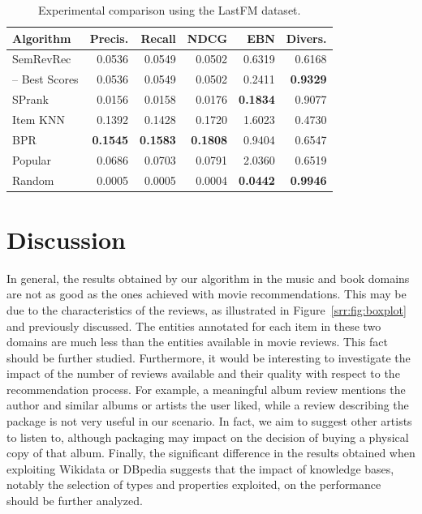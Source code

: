 \begin{table}
\centering
\begin{tabular}{@{}lrrrrr@{}}
\toprule
Algorithm & Precis. & Recall & NDCG   & EBN    & Divers. \\ \midrule
SemRevRec & 0.0536  & 0.0549 & 0.0502 & 0.6319 & 0.6168 \\
-- Best Scores & 0.0536  & 0.0549 & 0.0502 & 0.2411 & \textbf{0.9329} \\ \midrule
SPrank    & 0.0156  & 0.0158 & 0.0176 & \textbf{0.1834} & 0.9077 \\
Item KNN  & 0.1392  & 0.1428 & 0.1720 & 1.6023 & 0.4730 \\
BPR       & \textbf{0.1545}  & \textbf{0.1583} & \textbf{0.1808} & 0.9404 & 0.6547 \\
Popular   & 0.0686  & 0.0703 & 0.0791 & 2.0360 & 0.6519 \\
Random    & 0.0005  & 0.0005 & 0.0004 & \textbf{0.0442} & \textbf{0.9946} \\ \bottomrule
\end{tabular}
\caption[Comparison using the LastFM dataset]{Experimental comparison using the LastFM dataset.}
\label{srr:tab:ex2-fm}
\end{table}

\section{Discussion}
\label{srr:sec:discussion}

In general, the results obtained by our algorithm in the music and book domains are not as good as the ones achieved with movie recommendations. This may be due to the characteristics of the reviews, as illustrated in Figure~\ref{srr:fig:boxplot} and previously discussed. The entities annotated for each item in these two domains are much less than the entities available in movie reviews. This fact should be further studied. Furthermore, it would be interesting to investigate the impact of the number of reviews available and their quality with respect to the recommendation process. For example, a meaningful album review mentions the author and similar albums or artists the user liked, while a review describing the package is not very useful in our scenario. In fact, we aim to suggest other artists to listen to, although packaging may impact on the decision of buying a physical copy of that album. Finally, the significant difference in the results obtained when exploiting Wikidata or DBpedia suggests that the impact of knowledge bases, notably the selection of types and properties exploited, on the performance should be further analyzed.


